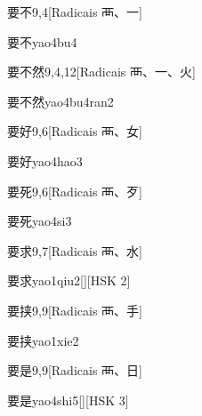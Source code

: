 \begin{entry}{要不}{9,4}[Radicais ⾑、⼀]
  \begin{phonetics}{要不}{yao4bu4}
  \end{phonetics}
\end{entry}

\begin{entry}{要不然}{9,4,12}[Radicais ⾑、⼀、⽕]
  \begin{phonetics}{要不然}{yao4bu4ran2}
  \end{phonetics}
\end{entry}

\begin{entry}{要好}{9,6}[Radicais ⾑、⼥]
  \begin{phonetics}{要好}{yao4hao3}
  \end{phonetics}
\end{entry}

\begin{entry}{要死}{9,6}[Radicais ⾑、⽍]
  \begin{phonetics}{要死}{yao4si3}
  \end{phonetics}
\end{entry}

\begin{entry}{要求}{9,7}[Radicais ⾑、⽔]
  \begin{phonetics}{要求}{yao1qiu2}[][HSK 2]
  \end{phonetics}
\end{entry}

\begin{entry}{要挟}{9,9}[Radicais ⾑、⼿]
  \begin{phonetics}{要挟}{yao1xie2}
  \end{phonetics}
\end{entry}

\begin{entry}{要是}{9,9}[Radicais ⾑、⽇]
  \begin{phonetics}{要是}{yao4shi5}[][HSK 3]
  \end{phonetics}
\end{entry}


